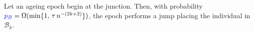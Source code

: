 \begin{lemma} 
	Let an ageing epoch begin at the junction.
	Then, with probability $\textcolor{blue}{p_B}=\Omega(\min\{1,\,\tau\,n^{-(2k+2)}\})$, the epoch performs a jump placing the individual in $\mathcal{B}_k$.
\end{lemma}



